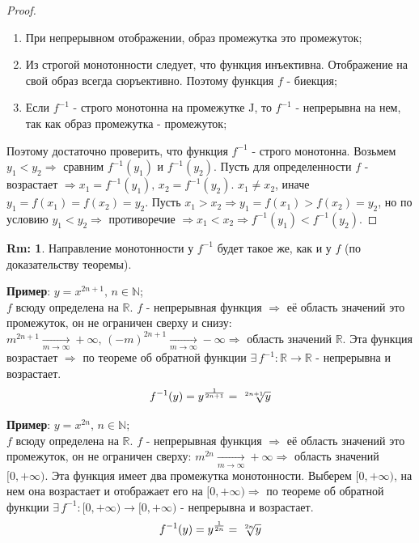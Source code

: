 \documentclass[12pt]{article}
\newcommand{\MR}{\mathbb{R}}
\newcommand{\MJ}{\mathrm{J}}
\theoremstyle{definition}
\newtheorem{rem}{Rm:}
\begin{document}
\begin{proof}\hfill
	\begin{enumerate}[label={\arabic*)}]
		\item При непрерывном отображении, образ промежутка это промежуток;
		\item Из строгой монотонности следует, что функция инъективна. Отображение на свой образ всегда сюръективно. Поэтому функция $f$ - биекция;
		\item Если $f^{-1}$ - строго монотонна на промежутке $\MJ$, то $f^{-1}$ - непрерывна на нем, так как образ промежутка - промежуток;
	\end{enumerate}
	Поэтому достаточно проверить, что функция $f^{-1}$ - строго монотонна. Возьмем $y_1 < y_2 \Rightarrow$ сравним $f^{-1}(y_1)$ и $f^{-1}(y_2)$. Пусть для определенности $f$ - возрастает $\Rightarrow x_1 = f^{-1}(y_1), \, x_2 = f^{-1}(y_2)$. $x_1 \neq x_2$, иначе $y_1 = f(x_1) = f(x_2) = y_2$. Пусть $x_1 > x_2 \Rightarrow y_1 = f(x_1) > f(x_2) = y_2$, но по условию $y_1 < y_2 \Rightarrow$ противоречие $\Rightarrow x_1 < x_2 \Rightarrow f^{-1}(y_1) < f^{-1}(y_2)$.
\end{proof}

\begin{rem}
	Направление монотонности у $f^{-1}$ будет такое же, как и у $f$ (по доказательству теоремы).
\end{rem}

\textbf{Пример}: $y = x^{2n+1}, \, n \in \mathbb{N}$; \\
$f$ всюду определена на $\MR$. $f$ - непрерывная функция $\Rightarrow$ её область значений это промежуток, он не ограничен сверху и снизу: $m^{2n+1} \xrightarrow[m\to \infty]{} +\infty, \, (-m)^{2n+1} \xrightarrow[m\to \infty]{} -\infty \Rightarrow$ область значений $\MR$. Эта функция возрастает $\Rightarrow$ по теореме об обратной функции $\exists \, f^{-1} \colon \MR \to \MR$ - непрерывна и возрастает. $$f^{-1}(y) = y^{\frac{1}{2n+1}} = \sqrt[\leftroot{-2}\uproot{2}{2n+1}]{y}$$

\textbf{Пример}: $y = x^{2n}, \, n \in \mathbb{N}$; \\
$f$ всюду определена на $\MR$. $f$ - непрерывная функция $\Rightarrow$ её область значений это промежуток, он не ограничен сверху: $m^{2n} \xrightarrow[m\to \infty]{} +\infty \Rightarrow$ область значений $[0, +\infty)$. Эта функция имеет два промежутка монотонности. Выберем $[0, +\infty)$, на нем она возрастает и отображает его на $[0, +\infty) \Rightarrow$ по теореме об обратной функции $\exists \, f^{-1} \colon [0, +\infty) \to [0, +\infty)$ - непрерывна и возрастает. $$f^{-1}(y) = y^{\frac{1}{2n}} = \sqrt[\leftroot{-2}\uproot{2}{2n}]{y}$$
\end{document}
